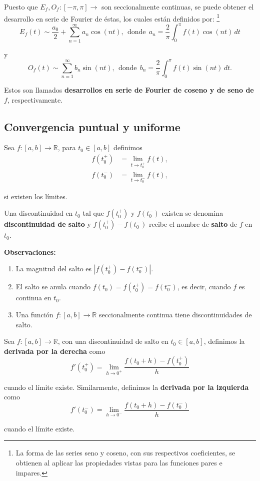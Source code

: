 Puesto que $E_f, O_f: [-\pi,\pi] \longrightarrow$ son seccionalmente continuas, se puede obtener el desarrollo en serie de Fourier de éstas, los cuales están definidos por: \footnote{La forma de las series seno y coseno, con sus respectivos coeficientes, se obtienen al aplicar las propiedades vistas para las funciones pares e impares.}
$$ E_f(t) \sim \frac{a_0}{2}  + \sum_{n=1}^{\infty} a_n \cos(nt), ~~\mbox{donde}~~ a_n = \frac{2}{\pi} \int_0^{\pi} f(t) \cos(nt)\,dt$$

y
$$ O_f(t) \sim  \sum_{n=1}^{\infty} b_n \sin(nt), ~~\mbox{donde} ~~ b_n = \frac{2}{\pi} \int_0^{\pi} f(t) \sin (nt)\,dt.$$

Estos son llamados \textbf{desarrollos en serie de Fourier de coseno y de seno de $f$}, respectivamente.

\subsection{Convergencia puntual y uniforme}

\begin{defi}
Sea $f: [a,b] \longrightarrow \mathbb{R}$, para $t_0 \in [a,b]$ definimos
\begin{align*}
    f(t_0^+) &= \lim_{t \to t_0^+} f(t), \\
    f(t_0^-) &= \lim_{t \to t_0^-} f(t),
\end{align*}

si existen los límites. 

Una discontinuidad en $t_0$ tal que $f(t_0^+)$ y $f(t_0^-)$ existen se denomina \textbf{discontinuidad de salto} y $f(t_0^+) - f(t_0^-)$ recibe el nombre de \textbf{salto} de $f$ en $t_0$.
\end{defi}

\textbf{Observaciones:} 

\begin{enumerate}
    \item La magnitud del salto es $|f(t_0^+) - f(t_0^-)|$.
    
    \item El salto se anula cuando $f(t_0) = f(t_0^+) = f(t_0^-)$, es decir, cuando $f$ es continua en $t_0$.
    
    \item Una función $f: [a,b] \longrightarrow \mathbb{R}$ seccionalmente continua tiene discontinuidades de salto.
\end{enumerate}

\begin{defi}
Sea $f:[a,b] \longrightarrow \mathbb{R}$, con una discontinuidad de salto en $t_0 \in [a,b]$, definimos la \textbf{derivada por la derecha} como 
$$f'(t_0^+) = \lim_{h \to 0^+} \frac{f(t_0 + h ) - f(t_0^+)}{h}$$

cuando el límite existe. Similarmente, definimos la \textbf{derivada por la izquierda} como 
$$f'(t_0^-) = \lim_{h \to 0^-} \frac{f(t_0 + h ) - f(t_0^-)}{h}$$

cuando el límite existe.
\end{defi}

